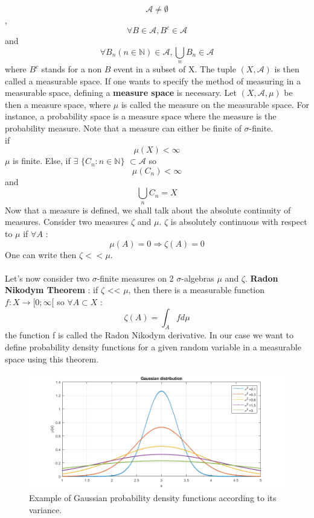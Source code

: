 \documentclass[11pt, a4paper, English]{report}
\begin{document}
$$ \mathcal{A} \neq \emptyset $$,
$$ \forall B \in \mathcal{A}, B^c \in \mathcal{A}$$
and 
$$ \forall B_n (n \in \mathbb{N}) \in \mathcal{A}, \bigcup_{n} B_n \in \mathcal{A} $$
where $B^c$ stands for a non $B$ event in a subset of X. The tuple $(X, \mathcal{A})$ is then called a measurable space. If one wants to specify the method of measuring in a measurable space, defining a \textbf{measure space} is necessary. Let $(X, \mathcal{A}, \mu)$ be then a measure space, where $\mu$ is called the measure on the measurable space. For instance, a probability space is a measure space where the measure is the probability measure. Note that a measure can either be finite of $\sigma$-finite. \\
if $$\mu(X) < \infty $$
$\mu$ is finite. Else, if $\exists$ $\{C_n : n \in \mathbb{N}\}$ $\subset \mathcal{A}$ so 
$$\mu(C_n) < \infty$$
and
$$\bigcup_n C_n = X $$
Now that a measure is defined, we shall talk about the absolute continuity of measures. Consider two measures $\zeta$ and $\mu$. $\zeta$ is absolutely continuous with respect to $\mu$ if $\forall A$ :
$$ \mu(A)=0 \Rightarrow \zeta(A)=0 $$
One can write then $\zeta << \mu$. \\\\
Let's now consider two $\sigma$-finite measures on 2 $\sigma$-algebras $\mu$ and $\zeta$.
\textbf{Radon Nikodym Theorem} : if $\zeta$ << $\mu$, then there is a measurable function $f:X \rightarrow [0;\infty[$ so $\forall A \subset X$ :
$$\zeta(A) = \int_A f d\mu $$
the function f is called the Radon Nikodym derivative. In our case we want to define probability density functions for a given random variable in a measurable space using this theorem. 
\begin{figure}[h!]
    \centering
    \includegraphics[width=\textwidth]{gaussian.png}
    \caption{Example of Gaussian probability density functions according to its variance.}
    \label{gaussian}
\end{figure}
\end{document}
